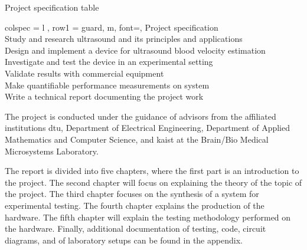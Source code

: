 \begin{table}[ht]
	\centering
	\caption{Project specification table}
	\label{tab:specifications}
	\begin{tblr}[]{%
			colspec = {l
			},
			row{1} = {guard, m, font=\small\bfseries},
		}
		\toprule
		Project specification	\\ 
		\midrule
		Study and research ultrasound and its principles and applications	\\
		Design and implement a device for ultrasound blood velocity estimation	\\
		Investigate and test the device in an experimental setting		\\
		Validate results with commercial equipment 						\\
		Make quantifiable performance measurements on system			\\
		Write a technical report documenting the project work			\\ \bottomrule
	\end{tblr}

\end{table}

The project is conducted under the guidance of advisors from the affiliated institutions \Gls{dtu}, Department of Electrical Engineering, Department of Applied Mathematics and Computer Science, and \Gls{kaist} at the Brain/Bio Medical Microsystems Laboratory.

The report is divided into five chapters, where the first part is an introduction to the project. The second chapter will focus on explaining the theory of the topic of the project. The third chapter focuses on the synthesis of a system for experimental testing. The fourth chapter explains the production of the hardware. The fifth chapter will explain the testing methodology performed on the hardware. Finally, additional documentation of testing, code, circuit diagrams, and of laboratory setups can be found in the appendix.